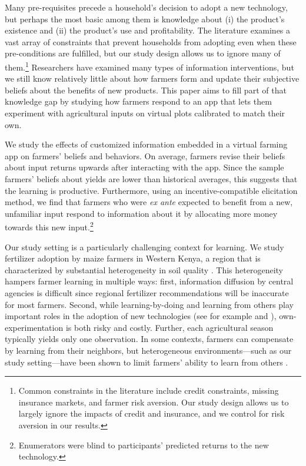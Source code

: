 \documentclass[12pt,letterpaper]{article}
\begin{document}
Many pre-requisites precede a household's decision to adopt a new technology, but perhaps the most basic among them is knowledge about (i) the product's existence and (ii) the product's use and profitability. The literature examines a vast array of constraints that prevent households from adopting even when these pre-conditions are fulfilled, but our study design allows us to ignore many of them.\footnote{Common constraints in the literature include credit constraints, missing insurance markets, and farmer risk aversion. Our study design allows us to largely ignore the impacts of credit and insurance, and we control for risk aversion in our results.} Researchers have examined many types of information interventions, but we still know relatively little about how farmers form and update their subjective beliefs about the benefits of new products. This paper aims to fill part of that knowledge gap by studying how farmers respond to an app that lets them experiment with agricultural inputs on virtual plots calibrated to match their own. 

We study the effects of customized information embedded in a virtual farming app on farmers' beliefs and behaviors. On average, farmers revise their beliefs about input returns upwards after interacting with the app. Since the sample farmers' beliefs about yields are lower than historical averages, this suggests that the learning is productive. Furthermore, using an incentive-compatible elicitation method, we find that farmers who were \emph{ex ante} expected to benefit from a new, unfamiliar input respond to information about it by allocating more money towards this new input.\footnote{Enumerators were blind to participants' predicted returns to the new technology.} 

Our study setting is a particularly challenging context for learning. We study fertilizer adoption by maize farmers in Western Kenya, a region that is characterized by substantial heterogeneity in soil quality \citep{tittonell_yield_2008}. This heterogeneity hampers farmer learning in multiple ways: first, information diffusion by central agencies is difficult since regional fertilizer recommendations  will be inaccurate for most farmers. Second, while learning-by-doing and learning from others play important roles in the adoption of new technologies (see for example \citealt{foster_learning_1995} and \citealt{conley_learning_2010}), own-experimentation is both risky and costly. Further, each agricultural season typically yields only one observation. In some contexts, farmers can compensate by learning from their neighbors, but heterogeneous environments---such as our study setting---have been shown to limit farmers' ability to learn from others \citep{munshi_social_2004,tjernstrom_learning_2018}.
\end{document}
